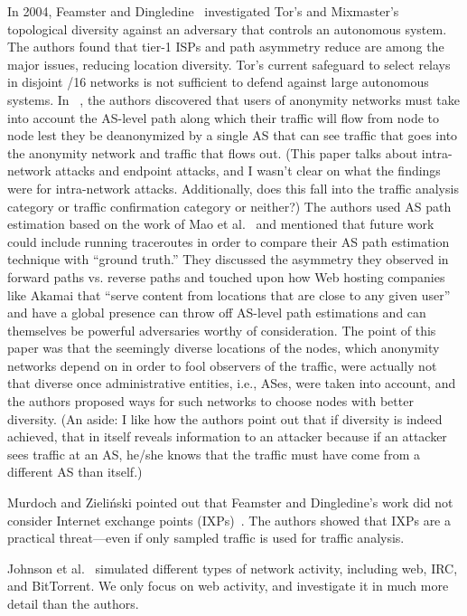 In 2004, Feamster and Dingledine~\cite{Feamster2004a} investigated Tor's and
Mixmaster's topological diversity against an adversary that controls an
autonomous system.  The authors found that tier-1 ISPs and path asymmetry reduce
are among the major issues, reducing location diversity.  Tor's current
safeguard to select relays in disjoint /16 networks is not sufficient to defend
against large autonomous systems. In ~\cite{Feamster2004a}, the authors discovered
that users of anonymity networks must take into account the AS-level path along
which their traffic will flow from node to node lest they be deanonymized by a
single AS that can see traffic that goes into the anonymity network and traffic that flows out.
(This paper talks about intra-network attacks and endpoint attacks, and
I wasn't clear on what the findings were for intra-network attacks. Additionally,
does this fall into the traffic analysis category or traffic confirmation category or neither?)
The authors used AS path estimation based on the work of Mao et al.~\cite{} and
mentioned that future work could include running traceroutes in order to compare
their AS path estimation technique with ``ground truth.'' They discussed the asymmetry
they observed in forward paths vs. reverse paths and touched upon how Web hosting companies
like Akamai that ``serve content from locations that are close to any given user''~\cite{Feamster2004a}
and have a global presence can throw off AS-level path estimations and can themselves
be powerful adversaries worthy of consideration. The point of this paper was that
the seemingly diverse locations of the nodes, which anonymity networks depend on
in order to fool observers of the traffic, were actually not that diverse once administrative
entities, i.e., ASes, were taken into account, and the authors proposed ways for
such networks to choose nodes with better diversity. (An aside: I like how the authors
point out that if diversity is indeed achieved, that in itself reveals information
to an attacker because if an attacker sees traffic at an AS, he/she knows that the
traffic must have come from a different AS than itself.)

Murdoch and Zieli\'{n}ski pointed out that Feamster and Dingledine's work did
not consider Internet exchange points (IXPs)~\cite{Murdoch2007a}.  The authors
showed that IXPs are a practical threat---even if only sampled traffic is used
for traffic analysis.

Johnson et al.~\cite{Johnson2013a} simulated different types of network
activity, including web, IRC, and BitTorrent.  We only focus on web activity,
and investigate it in much more detail than the authors.

